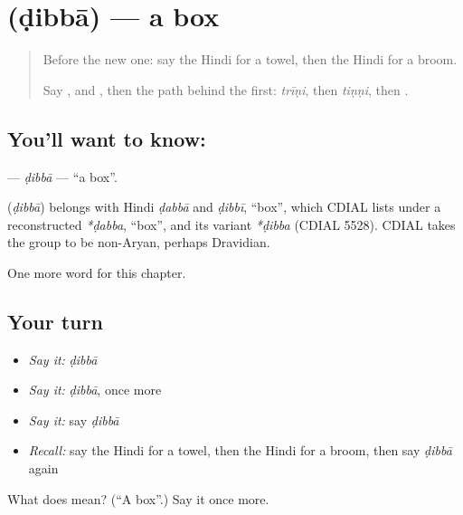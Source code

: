 \section[\texorpdfstring{\hi{डिब्बा} (ḍibbā)}{डिब्बा (ḍibbā)}]{ (ḍibbā) — a box}

\label{lesson:HI-C131-dibba}



\begin{quote}
Before the new one: say the Hindi for a towel, then the Hindi for a broom.

Say \textbf{}, \textbf{} and \textbf{}, then the path behind the first: \emph{trīṇi}, then \emph{tiṇṇi}, then \textbf{}.
\end{quote}

\subsection*{You'll want to know: }
\textbf{} — \emph{ḍibbā} — \textquotedblleft{}a box\textquotedblright{}.

\begin{cousinweb}
\textbf{} (\emph{ḍibbā}) belongs with Hindi \emph{ḍabbā} and \emph{ḍibbī}, \textquotedblleft{}box\textquotedblright{}, which CDIAL lists under a reconstructed \emph{*ḍabba}, \textquotedblleft{}box\textquotedblright{}, and its variant \emph{*ḍibba} (CDIAL 5528). CDIAL takes the group to be non-Aryan, perhaps Dravidian.
\end{cousinweb}

\begin{grammarlens}[title={What you've built}]
One more word for this chapter.
\end{grammarlens}

\subsection*{Your turn}
\begin{itemize}
\raggedright
  \item \emph{Say it:} \emph{ḍibbā}
  \item \emph{Say it:} \emph{ḍibbā}, once more
  \item \emph{Say it:} say \emph{ḍibbā}
  \item \emph{Recall:} say the Hindi for a towel, then the Hindi for a broom, then say \emph{ḍibbā} again
\end{itemize}

\begin{tcolorbox}[breakable,colback=teal!4,colframe=teal!35!black,title={Before you move on}]
What does  mean? (\textquotedblleft{}A box\textquotedblright{}.) Say it once more.
\end{tcolorbox}
